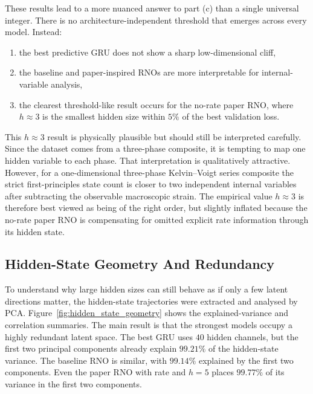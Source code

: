 \documentclass[11pt,a4paper]{article}
\begin{document}
These results lead to a more nuanced answer to part (c) than a single universal integer. There is no architecture-independent threshold that emerges across every model. Instead:
\begin{enumerate}[leftmargin=1.5em]
    \item the best predictive GRU does not show a sharp low-dimensional cliff,
    \item the baseline and paper-inspired RNOs are more interpretable for internal-variable analysis,
    \item the clearest threshold-like result occurs for the no-rate paper RNO, where $h\approx 3$ is the smallest hidden size within $5\%$ of the best validation loss.
\end{enumerate}

This $h\approx 3$ result is physically plausible but should still be interpreted carefully. Since the dataset comes from a three-phase composite, it is tempting to map one hidden variable to each phase. That interpretation is qualitatively attractive. However, for a one-dimensional three-phase Kelvin--Voigt series composite the strict first-principles state count is closer to two independent internal variables after subtracting the observable macroscopic strain. The empirical value $h\approx 3$ is therefore best viewed as being of the right order, but slightly inflated because the no-rate paper RNO is compensating for omitted explicit rate information through its hidden state.

\FloatBarrier
\subsection{Hidden-State Geometry And Redundancy}

To understand why large hidden sizes can still behave as if only a few latent directions matter, the hidden-state trajectories were extracted and analysed by PCA. Figure~\ref{fig:hidden_state_geometry} shows the explained-variance and correlation summaries. The main result is that the strongest models occupy a highly redundant latent space. The best GRU uses $40$ hidden channels, but the first two principal components already explain $99.21\%$ of the hidden-state variance. The baseline RNO is similar, with $99.14\%$ explained by the first two components. Even the paper RNO with rate and $h=5$ places $99.77\%$ of its variance in the first two components.
\end{document}
